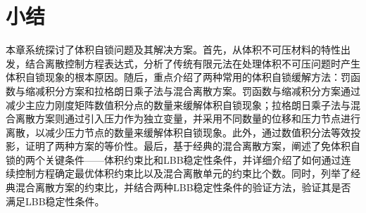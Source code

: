 \section{小结}
本章系统探讨了体积自锁问题及其解决方案。首先，从体积不可压材料的特性出发，结合离散控制方程表达式，分析了传统有限元法在处理体积不可压问题时产生体积自锁现象的根本原因。随后，重点介绍了两种常用的体积自锁缓解方法：罚函数与缩减积分方案和拉格朗日乘子法与混合离散方案。罚函数与缩减积分方案通过减少主应力刚度矩阵数值积分点的数量来缓解体积自锁现象；拉格朗日乘子法与混合离散方案则通过引入压力作为独立变量，并采用不同数量的位移和压力节点进行离散，以减少压力节点的数量来缓解体积自锁现象。此外，通过数值积分法等效投影，证明了两种方案的等价性。最后，基于经典的混合离散方案，阐述了免体积自锁的两个关键条件——体积约束比和LBB稳定性条件，并详细介绍了如何通过连续控制方程确定最优体积约束比以及混合离散单元的约束比个数。同时，列举了经典混合离散方案的约束比，并结合两种LBB稳定性条件的验证方法，验证其是否满足LBB稳定性条件。
